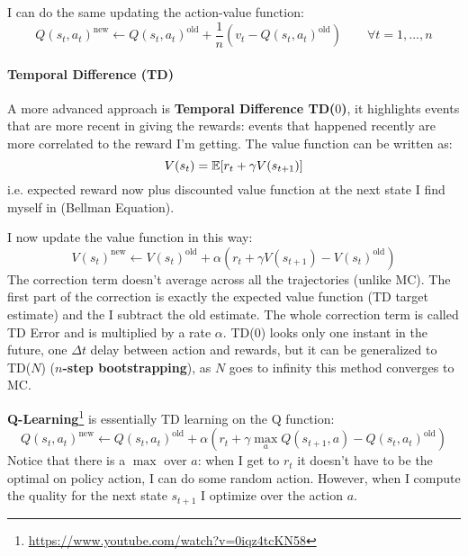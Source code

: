I can do the same updating the action-value function:
\[
    \boxed{Q(s_t,a_t)^{\text{new}}\leftarrow Q(s_t,a_t)^{\text{old}} + \frac{1}{n} \left( v_t - Q(s_t,a_t)^{\text{old}} \right) \qquad \forall t=1,\ldots,n}
\]

\paragraph{Temporal Difference (TD)}
A more advanced approach is \textbf{Temporal Difference TD($0$)}, it highlights events that are more recent in giving the rewards: events that happened recently are more correlated to the reward I'm getting. The value function can be written as:
\[
    V(s_t) = \mathbb{E}[r_t + \gamma V(s_{t+1})]
\]
i.e. expected reward now plus discounted value function at the next state I find myself in (Bellman Equation).

I now update the value function in this way:
\[
    \boxed{V(s_t)^{\text{new}}\leftarrow V(s_t)^{\text{old}} + \alpha \left( r_t + \gamma V(s_{t+1}) - V(s_t)^{\text{old}} \right)}
\]
The correction term doesn't average across all the trajectories (unlike MC). The first part of the correction is exactly the expected value function (TD target estimate) and the I subtract the old estimate. The whole correction term is called TD Error and is multiplied by a rate $\alpha$. TD($0$) looks only one instant in the future, one $\Delta t$ delay between action and rewards, but it can be generalized to TD($N$) (\textbf{$n$-step bootstrapping}), as $N$ goes to infinity this method converges to MC.

\textbf{Q-Learning}\footnote{\url{https://www.youtube.com/watch?v=0iqz4tcKN58}} is essentially TD learning on the Q function:
\[
    \boxed{Q(s_t,a_t)^{\text{new}}\leftarrow Q(s_t,a_t)^{\text{old}} + \alpha \left( r_t + \gamma \max_aQ(s_{t+1},a) - Q(s_t,a_t)^{\text{old}} \right)}
\]
Notice that there is a $\max$ over $a$: when I get to $r_t$ it doesn't have to be the optimal on policy action, I can do some random action. However, when I compute the quality for the next state $s_{t+1}$ I optimize over the action $a$.

